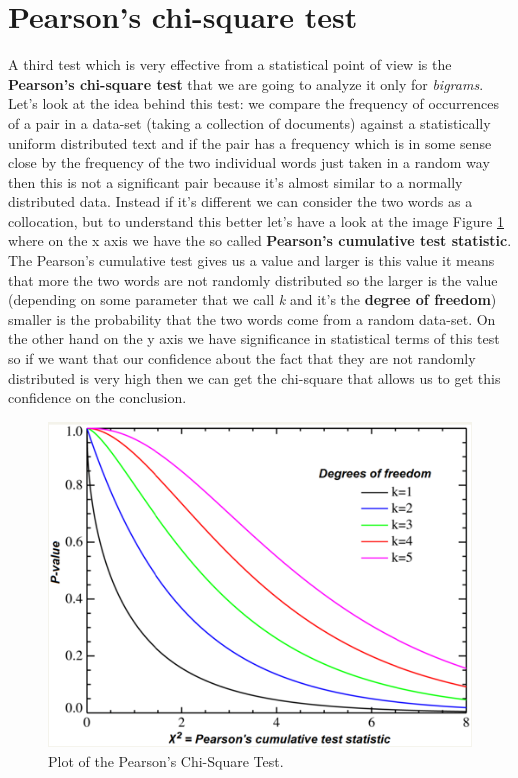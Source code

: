 \section{Pearson's chi-square test}
A third test which is very effective from a statistical point of view is the \textbf{Pearson's chi-square test} that we are going to analyze it only for \textit{bigrams}.\newline
Let's look at the idea behind this test: we compare the frequency of occurrences of a pair in a data-set (taking a collection of documents) against a statistically uniform distributed text and if the pair has a frequency which is in some sense close by the frequency of the two individual words just taken in a random way then this is not a significant pair because it's almost similar to a normally distributed data. Instead if it's different we can consider the two words as a collocation, but to understand this better let's have a look at the image Figure \ref{fig:pearsonchisquare} where on the x axis we have the so called \textbf{Pearson's cumulative test statistic}. The Pearson's cumulative test gives us a value and larger is this value it means that more the two words are not randomly distributed so the larger is the value (depending on some parameter that we call \textit{k} and it's the \textbf{degree of freedom}) smaller is the probability that the two words come from a random data-set. On the other hand on the y axis we have significance in statistical terms of this test so if we want that our confidence about the fact that they are not randomly distributed is very high then we can get the chi-square that allows us to get this confidence on the conclusion.\newline 
\begin{figure}
    \centering
    \includegraphics[width=0.75\linewidth]{images/pearsonchisquare.png}
    \caption{Plot of the Pearson's Chi-Square Test.}
    \label{fig:pearsonchisquare}
\end{figure}
